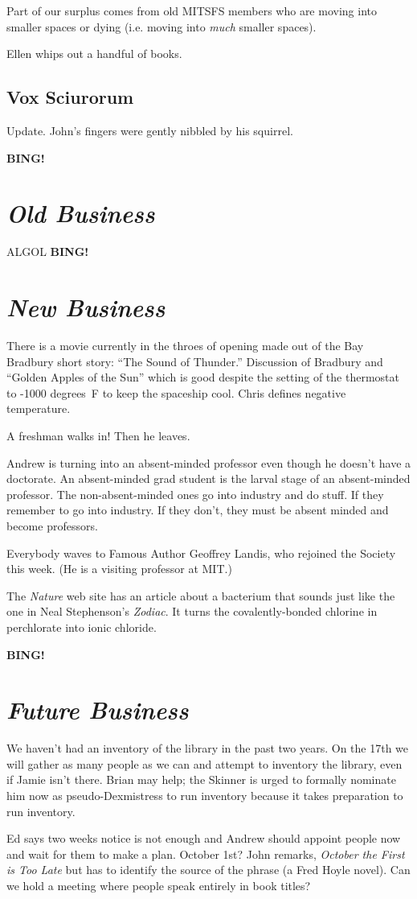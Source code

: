 \documentclass[10pt]{article}
\newcommand{\bing}{{\bf BING!} }
\newcommand{\goto}[1]{\bing \vskip 12pt \section*{{\em{#1}}}}
\begin{document}
Part of our surplus comes from old MITSFS members who are
moving into smaller spaces or dying (i.e. moving into
{\em much} smaller spaces).

Ellen whips out a handful of books.

\subsection*{Vox Sciurorum}
Update.  John's fingers were gently nibbled by his squirrel.

\goto{Old Business}


ALGOL
\goto{New Business}

There is a movie currently in the throes of opening made out of the Bay
Bradbury short story: ``The Sound of Thunder.''  Discussion of Bradbury
and ``Golden Apples of the Sun'' which is good despite the setting of the
thermostat to -1000 degrees~F to keep the spaceship cool.  Chris defines
negative temperature.

A freshman walks in!  Then he leaves.

Andrew is turning into an absent-minded professor even though he doesn't
have a doctorate.  An absent-minded grad student is the larval stage of
an absent-minded professor.  The non-absent-minded ones go into industry
and do stuff.  If they remember to go into industry.  If they don't, they
must be absent minded and become professors.

Everybody waves to Famous Author Geoffrey Landis, who rejoined the
Society this week.  (He is a visiting professor at MIT.)

The {\it Nature} web site has an article about a bacterium that
sounds just like the one in Neal Stephenson's {\it Zodiac}.
It turns the covalently-bonded chlorine in perchlorate into
ionic chloride.

\goto{Future Business}

We haven't had an inventory of the library in the past two years.
On the 17th we will gather as many people as we can and attempt
to inventory the library, even if Jamie isn't there.  Brian
may help; the Skinner is urged to formally nominate him now
as pseudo-Dexmistress to run inventory because it takes
preparation to run inventory.

Ed says two weeks notice is not enough and Andrew should
appoint people now and wait for them to make a plan.
October 1st?  John remarks, {\em October the First is Too Late}
but has to identify the source of the phrase (a Fred Hoyle novel).
Can we hold a meeting where people speak entirely in book titles?
\end{document}
